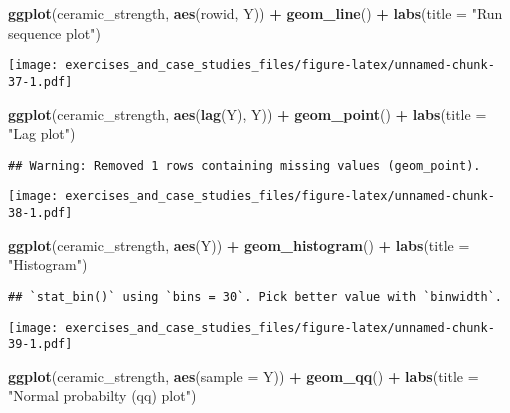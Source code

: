 \documentclass[]{book}
\newenvironment{Shaded}{\begin{snugshade}}{\end{snugshade}}
\newcommand{\DataTypeTok}[1]{\textcolor[rgb]{0.13,0.29,0.53}{#1}}
\newcommand{\KeywordTok}[1]{\textcolor[rgb]{0.13,0.29,0.53}{\textbf{#1}}}
\newcommand{\NormalTok}[1]{#1}
\newcommand{\OperatorTok}[1]{\textcolor[rgb]{0.81,0.36,0.00}{\textbf{#1}}}
\newcommand{\StringTok}[1]{\textcolor[rgb]{0.31,0.60,0.02}{#1}}
\theoremstyle{definition}
\theoremstyle{definition}
\theoremstyle{definition}
\theoremstyle{remark}
\begin{document}
\begin{Shaded}
\begin{Highlighting}[]
\KeywordTok{ggplot}\NormalTok{(ceramic_strength, }\KeywordTok{aes}\NormalTok{(rowid, Y)) }\OperatorTok{+}
\StringTok{  }\KeywordTok{geom_line}\NormalTok{() }\OperatorTok{+}
\StringTok{  }\KeywordTok{labs}\NormalTok{(}\DataTypeTok{title =} \StringTok{"Run sequence plot"}\NormalTok{)}
\end{Highlighting}
\end{Shaded}

\texttt{[image: exercises\_and\_case\_studies\_files/figure-latex/unnamed-chunk-37-1.pdf]}

\begin{Shaded}
\begin{Highlighting}[]
\KeywordTok{ggplot}\NormalTok{(ceramic_strength, }\KeywordTok{aes}\NormalTok{(}\KeywordTok{lag}\NormalTok{(Y), Y)) }\OperatorTok{+}
\StringTok{  }\KeywordTok{geom_point}\NormalTok{() }\OperatorTok{+}
\StringTok{  }\KeywordTok{labs}\NormalTok{(}\DataTypeTok{title =} \StringTok{"Lag plot"}\NormalTok{)}
\end{Highlighting}
\end{Shaded}

\begin{verbatim}
## Warning: Removed 1 rows containing missing values (geom_point).
\end{verbatim}

\texttt{[image: exercises\_and\_case\_studies\_files/figure-latex/unnamed-chunk-38-1.pdf]}

\begin{Shaded}
\begin{Highlighting}[]
\KeywordTok{ggplot}\NormalTok{(ceramic_strength, }\KeywordTok{aes}\NormalTok{(Y)) }\OperatorTok{+}
\StringTok{  }\KeywordTok{geom_histogram}\NormalTok{() }\OperatorTok{+}
\StringTok{  }\KeywordTok{labs}\NormalTok{(}\DataTypeTok{title =} \StringTok{"Histogram"}\NormalTok{)}
\end{Highlighting}
\end{Shaded}

\begin{verbatim}
## `stat_bin()` using `bins = 30`. Pick better value with `binwidth`.
\end{verbatim}

\texttt{[image: exercises\_and\_case\_studies\_files/figure-latex/unnamed-chunk-39-1.pdf]}

\begin{Shaded}
\begin{Highlighting}[]
\KeywordTok{ggplot}\NormalTok{(ceramic_strength, }\KeywordTok{aes}\NormalTok{(}\DataTypeTok{sample =}\NormalTok{ Y)) }\OperatorTok{+}
\StringTok{  }\KeywordTok{geom_qq}\NormalTok{() }\OperatorTok{+}
\StringTok{  }\KeywordTok{labs}\NormalTok{(}\DataTypeTok{title =} \StringTok{"Normal probabilty (qq) plot"}\NormalTok{)}
\end{Highlighting}
\end{Shaded}
\end{document}
